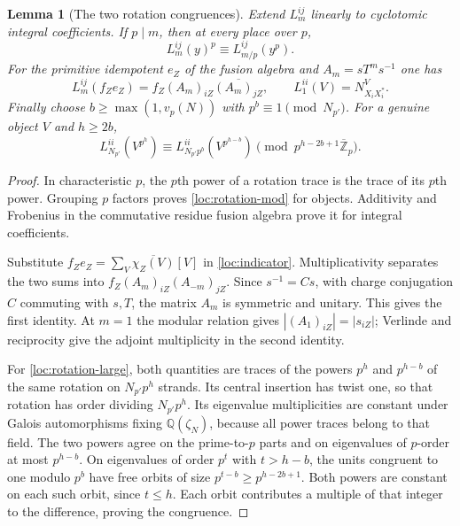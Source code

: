 \documentclass[11pt,a4paper]{article}
\numberwithin{equation}{section}
\newtheorem{lemma}[theorem]{Lemma}
\begin{document}
\begin{lemma}[The two rotation congruences]\label{loc:rotation}
Extend $L_m^{ij}$ linearly to cyclotomic integral coefficients. If
$p\mid m$, then at every place over $p$,
\begin{equation}\label{loc:rotation-mod}
                 L_m^{ij}(y)^p\equiv L_{m/p}^{ij}(y^p).
\end{equation}
For the primitive idempotent $e_Z$ of the fusion algebra and
$A_m=sT^ms^{-1}$ one has
\begin{equation}\label{loc:rotation-entry}
 L_m^{ij}(f_Ze_Z)=f_Z(A_m)_{iZ}\overline{(A_m)_{jZ}},
 \qquad L_1^{ii}(V)=N_{X_iX_i^*}^{V}.
\end{equation}
Finally choose $b\ge\max(1,v_p(N))$ with
$p^b\equiv1\pmod{N_{p'}}$. For a genuine object $V$ and $h\ge2b$,
\begin{equation}\label{loc:rotation-large}
 L_{N_{p'}}^{ii}(V^{p^h})
 \equiv L_{N_{p'}p^b}^{ii}(V^{p^{h-b}})
       \pmod{p^{h-2b+1}\overline{\mathbb Z}_p}.
\end{equation}
\end{lemma}
\begin{proof}
In characteristic $p$, the $p$th power of a rotation trace is the
trace of its $p$th power. Grouping $p$ factors proves
\eqref{loc:rotation-mod} for objects. Additivity and Frobenius in the
commutative residue fusion algebra prove it for integral coefficients.

Substitute
$f_Ze_Z=\sum_V\overline{\chi_Z(V)}[V]$ in
\eqref{loc:indicator}. Multiplicativity separates the two sums into
$f_Z(A_m)_{iZ}(A_{-m})_{jZ}$. Since $s^{-1}=Cs$, with charge
conjugation $C$ commuting with $s,T$, the matrix $A_m$ is symmetric
and unitary. This gives the first identity. At $m=1$ the modular
relation gives $|(A_1)_{iZ}|=|s_{iZ}|$; Verlinde and reciprocity give
the adjoint multiplicity in the second identity.

For \eqref{loc:rotation-large}, both quantities are traces of the
powers $p^h$ and $p^{h-b}$ of the same rotation on
$N_{p'}p^h$ strands. Its central insertion has twist one, so that
rotation has order dividing $N_{p'}p^h$. Its eigenvalue multiplicities
are constant under Galois automorphisms fixing $\mathbb Q(\zeta_N)$,
because all power traces belong to that field. The two powers agree
on the prime-to-$p$ parts and on eigenvalues of $p$-order at most
$p^{h-b}$. On eigenvalues of order $p^t$ with $t>h-b$, the units
congruent to one modulo $p^b$ have free orbits of size
$p^{t-b}\ge p^{h-2b+1}$. Both powers are constant on each such
orbit, since $t\le h$. Each orbit contributes a multiple of that
integer to the difference, proving the congruence.
\end{proof}
\end{document}
